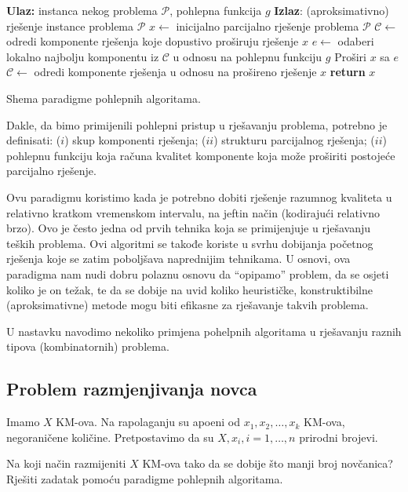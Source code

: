 \begin{algorithm}
	\begin{algorithmic}[1]
		\State \textbf{Ulaz:}   instanca nekog problema $\mathcal{P}$, pohlepna funkcija $g$
		\State \textbf{Izlaz}: (aproksimativno) rješenje instance problema $\mathcal{P}$
		\State $x\gets$ inicijalno parcijalno rješenje problema $\mathcal{P}$
		\State $\mathcal{C}\gets$ odredi komponente rješenja koje dopustivo proširuju rješenje $x$
		    \State $e \gets$ odaberi lokalno najbolju komponentu iz $\mathcal{C}$ u odnosu na pohlepnu funkciju $g$
		    \State Proširi $x$ sa $e$
		     \State $\mathcal{C}\gets$ odredi komponente rješenja u odnosu na prošireno rješenje $x$
		\EndWhile
		   \State \textbf{return} $x$
	\end{algorithmic}

    \caption{Shema paradigme pohlepnih algoritama.}    \label{alg:greedy-algorithm}
\end{algorithm}

Dakle, da bimo primijenili pohlepni pristup u rješavanju problema, potrebno je definisati: ($i$) skup komponenti rješenja; ($ii$) strukturu parcijalnog rješenja; ($ii$) pohlepnu funkciju koja računa kvalitet komponente koja može proširiti postojeće parcijalno rješenje. 



Ovu paradigmu koristimo kada je potrebno dobiti rješenje razumnog kvaliteta   u relativno kratkom vremenskom intervalu, na jeftin način (kodirajući relativno brzo). Ovo je često jedna od prvih tehnika koja se primijenjuje u rješavanju teških 
problema.  Ovi algoritmi se takođe koriste u svrhu dobijanja početnog rješenja koje se zatim  poboljšava naprednijim tehnikama. U osnovi, ova paradigma nam nudi dobru polaznu osnovu da ``opipamo'' problem, da se osjeti  koliko je on težak, te da se dobije na uvid koliko heurističke, konstruktibilne (aproksimativne) metode mogu biti efikasne za rješavanje takvih problema.

U nastavku navodimo nekoliko primjena pohelpnih algoritama u rješavanju raznih tipova (kombinatornih) problema. 

\subsection{Problem razmjenjivanja novca}

\begin{example}
 Imamo  $X$ KM-ova. Na rapolaganju su apoeni od $x_1, x_2, \ldots , x_k$ KM-ova, negoraničene količine. Pretpostavimo da su $X, x_i, i=1,\ldots, n$ prirodni brojevi.

Na koji način razmijeniti $X$ KM-ova tako da se dobije što manji broj
novčanica? Rješiti zadatak pomoću paradigme pohlepnih algoritama.
\end{example}

